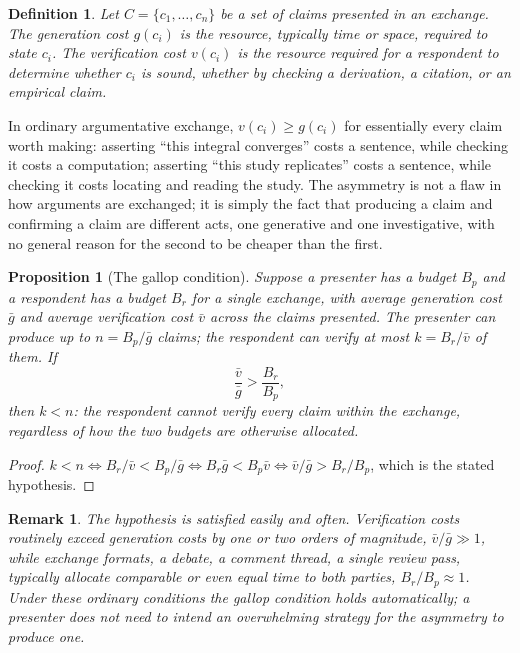 \documentclass[11pt]{book}
\newtheorem*{appendixdefinition}{Definition}
\newtheorem*{appendixproposition}{Proposition}
\newtheorem*{appendixremark}{Remark}
\begin{document}
\begin{appendixdefinition}
Let $C = \{c_1, \dots, c_n\}$ be a set of claims presented in an exchange. The \emph{generation cost} $g(c_i)$ is the resource, typically time or space, required to state $c_i$. The \emph{verification cost} $v(c_i)$ is the resource required for a respondent to determine whether $c_i$ is sound, whether by checking a derivation, a citation, or an empirical claim.
\end{appendixdefinition}

In ordinary argumentative exchange, $v(c_i) \geq g(c_i)$ for essentially every claim worth making: asserting ``this integral converges'' costs a sentence, while checking it costs a computation; asserting ``this study replicates'' costs a sentence, while checking it costs locating and reading the study. The asymmetry is not a flaw in how arguments are exchanged; it is simply the fact that producing a claim and confirming a claim are different acts, one generative and one investigative, with no general reason for the second to be cheaper than the first.

\begin{appendixproposition}[The gallop condition]
Suppose a presenter has a budget $B_p$ and a respondent has a budget $B_r$ for a single exchange, with average generation cost $\bar g$ and average verification cost $\bar v$ across the claims presented. The presenter can produce up to $n = B_p / \bar g$ claims; the respondent can verify at most $k = B_r / \bar v$ of them. If
\[
\frac{\bar v}{\bar g} > \frac{B_r}{B_p},
\]
then $k < n$: the respondent cannot verify every claim within the exchange, regardless of how the two budgets are otherwise allocated.
\end{appendixproposition}

\begin{proof}
$k < n \iff B_r/\bar v < B_p/\bar g \iff B_r \bar g < B_p \bar v \iff \bar v/\bar g > B_r/B_p$, which is the stated hypothesis.
\end{proof}

\begin{appendixremark}
The hypothesis is satisfied easily and often. Verification costs routinely exceed generation costs by one or two orders of magnitude, $\bar v / \bar g \gg 1$, while exchange formats, a debate, a comment thread, a single review pass, typically allocate comparable or even equal time to both parties, $B_r / B_p \approx 1$. Under these ordinary conditions the gallop condition holds automatically; a presenter does not need to intend an overwhelming strategy for the asymmetry to produce one.
\end{appendixremark}
\end{document}
